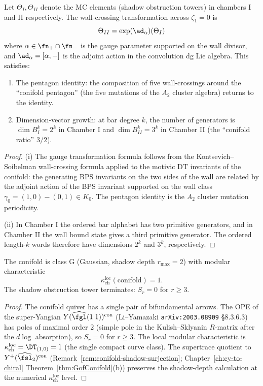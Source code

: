\begin{theorem}
\label{thm:conifold-wall-crossing}
Let $\Theta_I, \Theta_{II}$ denote the MC elements (shadow obstruction towers) in chambers I and II respectively. The wall-crossing transformation across $\zeta_1 = 0$ is
\[
 \Theta_{II} = \exp(\ad_\alpha)(\Theta_I)
\]
where $\alpha \in \fn_+ \cap \fn_-$ is the gauge parameter supported on the wall divisor, and $\ad_\alpha = [\alpha, -]$ is the adjoint action in the convolution dg Lie algebra. This satisfies:
\begin{enumerate}[label=(\roman*)]
 \item The pentagon identity: the composition of five wall-crossings around the ``conifold pentagon'' (the five mutations of the $A_2$ cluster algebra) returns to the identity.
 \item Dimension-vector growth: at bar degree $k$, the number of generators is $\dim B^k_I = 2^k$ in Chamber I and $\dim B^k_{II} = 3^k$ in Chamber II (the ``conifold ratio'' $3/2$).
\end{enumerate}
\end{theorem}

\begin{proof}
(i) The gauge transformation formula follows from the Kontsevich--Soibelman wall-crossing formula applied to the motivic DT invariants of the conifold: the generating BPS invariants on the two sides of the wall are related by the adjoint action of the BPS invariant supported on the wall class $\gamma_0 = (1,0) - (0,1) \in K_0$. The pentagon identity is the $A_2$ cluster mutation periodicity.

(ii) In Chamber I the ordered bar alphabet has two primitive generators,
and in Chamber II the wall bound state gives a third primitive generator.
The ordered length-$k$ words therefore have dimensions \(2^k\) and
\(3^k\), respectively.
\end{proof}

\begin{corollary}
\label{cor:conifold-shadow}
The conifold is class G (Gaussian, shadow depth $r_{\max} = 2$) with modular characteristic
\[
 \kappa_{\mathrm{ch}}^{\mathrm{loc}}(\text{conifold}) = 1.
\]
The shadow obstruction tower terminates: $S_r = 0$ for $r \geq 3$.
\end{corollary}

\begin{proof}
The conifold quiver has a single pair of bifundamental arrows. The OPE of the super-Yangian $Y(\widehat{\fgl}(1|1))^{\mathrm{con}}$ (Li--Yamazaki \texttt{arXiv:2003.08909} \S$8.3.6.3$) has poles of maximal order $2$ (simple pole in the Kulish--Sklyanin $R$-matrix after the $d\log$ absorption), so $S_r = 0$ for $r \geq 3$. The local modular characteristic is $\kappa_{\mathrm{ch}}^{\mathrm{loc}} = \DT_{(1,0)} = 1$ (the single compact curve class). The supertrace quotient to $Y^+(\widehat{\fsl}_2)^{\mathrm{con}}$ (Remark~\ref{rem:conifold-shadow-surjection}; Chapter~\ref{ch:cy-to-chiral} Theorem~\ref{thm:GofConifold}(b)) preserves the shadow-depth calculation at the numerical $\kappa_{\mathrm{ch}}^{\mathrm{loc}}$ level.
\end{proof}

